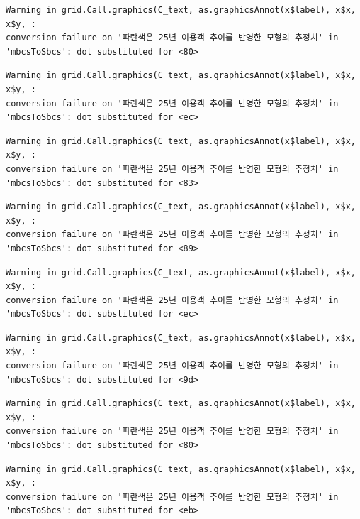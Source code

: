 \documentclass[
  letterpaper,
  DIV=11,
  numbers=noendperiod]{scrreprt}
\begin{document}
\begin{verbatim}
Warning in grid.Call.graphics(C_text, as.graphicsAnnot(x$label), x$x, x$y, :
conversion failure on '파란색은 25년 이용객 추이를 반영한 모형의 추정치' in
'mbcsToSbcs': dot substituted for <80>
\end{verbatim}

\begin{verbatim}
Warning in grid.Call.graphics(C_text, as.graphicsAnnot(x$label), x$x, x$y, :
conversion failure on '파란색은 25년 이용객 추이를 반영한 모형의 추정치' in
'mbcsToSbcs': dot substituted for <ec>
\end{verbatim}

\begin{verbatim}
Warning in grid.Call.graphics(C_text, as.graphicsAnnot(x$label), x$x, x$y, :
conversion failure on '파란색은 25년 이용객 추이를 반영한 모형의 추정치' in
'mbcsToSbcs': dot substituted for <83>
\end{verbatim}

\begin{verbatim}
Warning in grid.Call.graphics(C_text, as.graphicsAnnot(x$label), x$x, x$y, :
conversion failure on '파란색은 25년 이용객 추이를 반영한 모형의 추정치' in
'mbcsToSbcs': dot substituted for <89>
\end{verbatim}

\begin{verbatim}
Warning in grid.Call.graphics(C_text, as.graphicsAnnot(x$label), x$x, x$y, :
conversion failure on '파란색은 25년 이용객 추이를 반영한 모형의 추정치' in
'mbcsToSbcs': dot substituted for <ec>
\end{verbatim}

\begin{verbatim}
Warning in grid.Call.graphics(C_text, as.graphicsAnnot(x$label), x$x, x$y, :
conversion failure on '파란색은 25년 이용객 추이를 반영한 모형의 추정치' in
'mbcsToSbcs': dot substituted for <9d>
\end{verbatim}

\begin{verbatim}
Warning in grid.Call.graphics(C_text, as.graphicsAnnot(x$label), x$x, x$y, :
conversion failure on '파란색은 25년 이용객 추이를 반영한 모형의 추정치' in
'mbcsToSbcs': dot substituted for <80>
\end{verbatim}

\begin{verbatim}
Warning in grid.Call.graphics(C_text, as.graphicsAnnot(x$label), x$x, x$y, :
conversion failure on '파란색은 25년 이용객 추이를 반영한 모형의 추정치' in
'mbcsToSbcs': dot substituted for <eb>
\end{verbatim}
\end{document}
